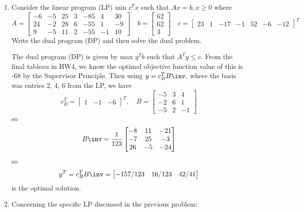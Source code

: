 \documentclass{article}
\begin{document}
\begin{enumerate}
	\item Consider the linear program (LP) min $c^T x$ such that $Ax=b, x\ge 0$ where \[A=\begin{bmatrix}
				-6 & -5 & 25 & 3 & -85 & 4 & 30 \\
				24 & -2 & 28 & 6 & -55 & 1 & -9 \\
				9 & -5 & 11 & 2 & -55 & -1 & 10
			\end{bmatrix}\quad b=\begin{bmatrix}
				62 \\ 62 \\ 3
			\end{bmatrix}\quad c=\begin{bmatrix}
				23 & 1 & -17 & -1 & 52 & -6 & -12
		\end{bmatrix}^T\]
		Write the dual program (DP) and then solve the dual problem.
		\begin{soln}
			The dual program (DP) is given by max $y^T b$ such that $A^T y\le c.$ From the final tableau in HW4, we know the optimal objective function value of this is -68 by the Supervisor Principle. Then using $y=c_B^T B\inv,$ where the basis was entries 2, 4, 6 from the LP, we have \[c_B^T=\begin{bmatrix}
					1 & -1 & -6
				\end{bmatrix}^T, \quad B = \begin{bmatrix}
					-5 & 3 & 4 \\
					-2 & 6 & 1 \\
					-5 & 2 & -1
			\end{bmatrix}\] so \[B\inv = \frac{1}{123}\begin{bmatrix}
					-8 & 11 & -21 \\
					-7 & 25 & -3 \\
					26 & -5 & -24
			\end{bmatrix}\] so \[y^T=c_B^T B\inv = \begin{bmatrix}
					-157/123 & 16/123 & 42/41
			\end{bmatrix}\] is the optimal solution.
			
		\end{soln}

	\item Concerning the specific LP discussed in the previous problem:


\end{enumerate}
\end{document}
